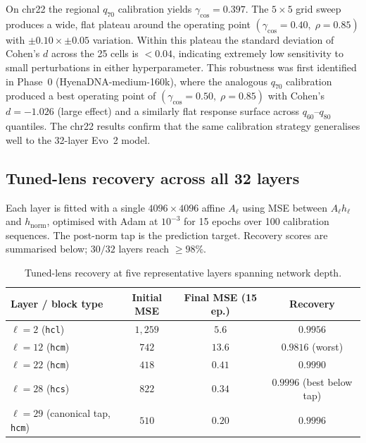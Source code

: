 \documentclass{article}
\theoremstyle{plain}
\theoremstyle{definition}
\theoremstyle{remark}
\newcommand{\hnorm}{h_{\mathrm{norm}}}
\begin{document}
On chr22 the regional $q_{70}$ calibration yields
$\gamma_{\cos} = 0.397$. The $5\times 5$ grid sweep produces a wide,
flat plateau around the operating point
$(\gamma_{\cos}=0.40,\; \rho=0.85)$ with $\pm 0.10 \times \pm 0.05$
variation. Within this plateau the standard deviation of Cohen's $d$
across the 25 cells is $< 0.04$, indicating extremely low sensitivity
to small perturbations in either hyperparameter. This robustness was
first identified in Phase~0 (HyenaDNA-medium-160k), where the analogous
$q_{70}$ calibration produced a best operating point of
$(\gamma_{\cos}=0.50,\; \rho=0.85)$ with Cohen's $d = -1.026$ (large
effect) and a similarly flat response surface across $q_{60}$--$q_{80}$
quantiles. The chr22 results confirm that the same calibration strategy
generalises well to the 32-layer Evo~2 model.

\subsection{Tuned-lens recovery across all 32 layers}
\label{app:tuned-lens}

Each layer is fitted with a single $4096\times 4096$ affine $A_{\ell}$
using MSE between $A_{\ell} h_{\ell}$ and $\hnorm$, optimised with Adam
at $10^{-3}$ for 15 epochs over 100 calibration sequences. The
post-norm tap is the prediction target. Recovery scores are summarised
below; $30/32$ layers reach $\ge 98\%$.

\begin{table}[h]
\caption{Tuned-lens recovery at five representative layers spanning
network depth.}
\label{tab:tuned-lens}
\centering
\small
\begin{tabular}{@{}lccc@{}}
\toprule
Layer / block type & Initial MSE & Final MSE (15 ep.) & Recovery \\
\midrule
$\ell=2$ (\texttt{hcl}) & $1{,}259$ & $5.6$ & $0.9956$ \\
$\ell=12$ (\texttt{hcm}) & $742$ & $13.6$ & $0.9816$ (worst) \\
$\ell=22$ (\texttt{hcm}) & $418$ & $0.41$ & $0.9990$ \\
$\ell=28$ (\texttt{hcs}) & $822$ & $0.34$ & $0.9996$ (best below tap) \\
$\ell=29$ (canonical tap, \texttt{hcm}) & $510$ & $0.20$ & $0.9996$ \\
\bottomrule
\end{tabular}
\end{table}

\end{document}
